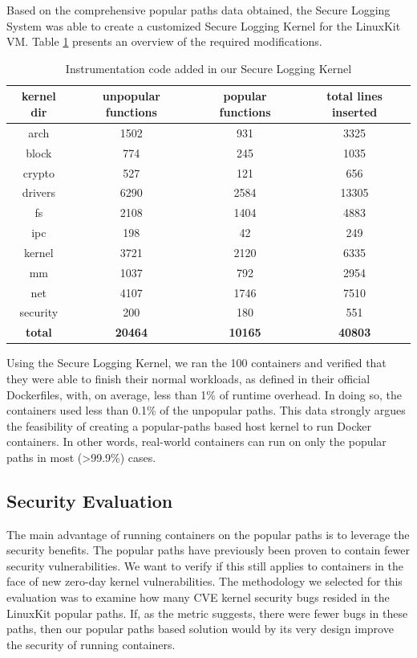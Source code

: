 Based on the comprehensive popular paths data obtained, the Secure Logging System was able to create a customized Secure Logging Kernel for the LinuxKit VM. 
Table \ref{tab:kernel_instrumentation} presents an overview of the required modifications. 

\begin{table}[h!]
\begin{center}
\caption{Instrumentation code added in our Secure Logging Kernel}
\label{tab:kernel_instrumentation}
\begin{tabular}{c|c|c|c}
 kernel dir & unpopular functions & popular functions & total lines inserted \\
 \hline
 arch & 1502 & 931 & 3325 \\
 \hline
 block & 774 & 245 & 1035 \\
 \hline
 crypto & 527 & 121 & 656 \\ 
 \hline
 drivers & 6290 & 2584 & 13305 \\
 \hline
 fs & 2108 & 1404 & 4883 \\
 \hline
 ipc & 198 & 42 & 249 \\
 \hline
 kernel & 3721 & 2120 & 6335 \\
 \hline
 mm & 1037 & 792 & 2954 \\
 \hline
 net & 4107 & 1746 & 7510 \\
 \hline
 security & 200 & 180 & 551 \\
 \hline
 \textbf{total} & \textbf{20464} & \textbf{10165} & \textbf{40803} \\
\end{tabular}
\end{center}
\end{table}

Using  the Secure Logging Kernel, we ran the 100 containers and verified that they were able to finish their normal workloads, 
as defined in their official Dockerfiles, with, on average, less than 1\% of runtime overhead. 
In doing so, the containers used less than 0.1\% of the unpopular paths. 
This data strongly argues the feasibility of creating a popular-paths based host kernel to run Docker containers. 
In other words, real-world containers can run on only the popular paths in most (>99.9\%) cases. 

\subsection{Security Evaluation}
\label{sec.evaluation.security} 
The main advantage of running containers on the popular paths is to leverage the security benefits. 
The popular paths have previously been proven to contain fewer security vulnerabilities. 
We want to verify if this still applies to containers in the face of new zero-day kernel vulnerabilities. 
The methodology we selected for this evaluation was to examine how many CVE kernel security bugs resided in the LinuxKit popular paths. 
If, as the metric suggests, there were fewer bugs in these paths, then our popular paths based solution would by its very design improve the security of running containers.

